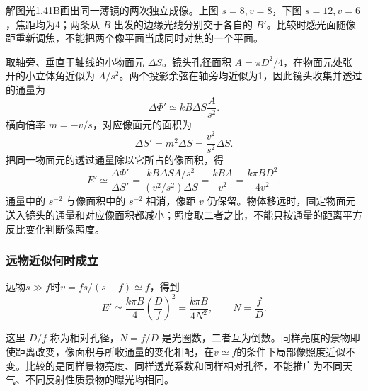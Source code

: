 \documentclass[UTF8,fontset=fandol,a4paper,11pt]{ctexart}
\begin{document}
解图光1.41B画出同一薄镜的两次独立成像。上图 $s=8,v=8$，下图 $s=12,v=6$，焦距均为4；两条从 $B$ 出发的边缘光线分别交于各自的 $B'$。比较时感光面随像距重新调焦，不能把两个像平面当成同时对焦的一个平面。

取轴旁、垂直于轴线的小物面元 $\Delta S$。镜头孔径面积 $A=\pi D^2/4$，在物面元处张开的小立体角近似为 $A/s^2$。两个投影余弦在轴旁均近似为1，因此镜头收集并透过的通量为
\[
\Delta\Phi'\simeq kB\Delta S\frac{A}{s^2}.
\]
横向倍率 $m=-v/s$，对应像面元的面积为
\[
\Delta S'=m^2\Delta S=\frac{v^2}{s^2}\Delta S.
\]
把同一物面元的透过通量除以它所占的像面积，得
\[
E'\simeq\frac{\Delta\Phi'}{\Delta S'}
=\frac{kB\Delta S A/s^2}{(v^2/s^2)\Delta S}
=\frac{kBA}{v^2}=\frac{k\pi BD^2}{4v^2}.
\]
通量中的 $s^{-2}$ 与像面积中的 $s^{-2}$ 相消，像距 $v$ 仍保留。物体移远时，固定物面元送入镜头的通量和对应像面积都减小；照度取二者之比，不能只按通量的距离平方反比变化判断像照度。

\subsubsection*{远物近似何时成立}
远物$s\gg f$时$v=fs/(s-f)\simeq f$，得到
\[
\boxed{E'\simeq\frac{k\pi B}{4}\left(\frac Df\right)^2
=\frac{k\pi B}{4N^2}},\qquad N=\frac fD.
\]

这里 $D/f$ 称为相对孔径，$N=f/D$ 是光圈数，二者互为倒数。同样亮度的景物即使距离改变，像面积与所收通量的变化相配，在$v\simeq f$的条件下局部像照度近似不变。比较的是同样景物亮度、同样透光系数和同样相对孔径，不能推广为不同天气、不同反射性质景物的曝光均相同。
\end{document}
